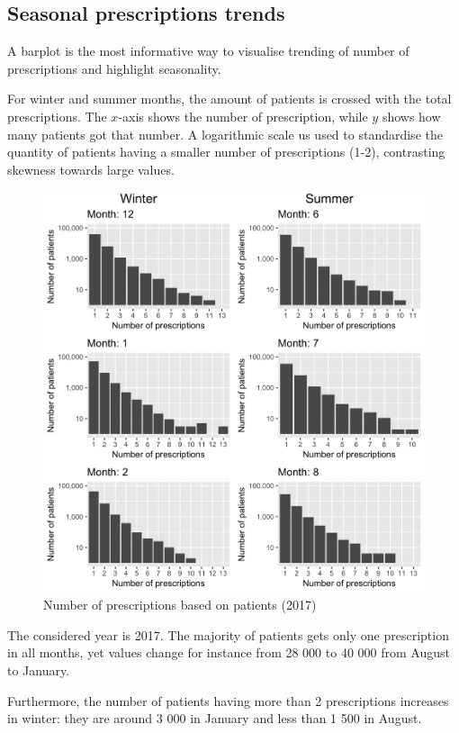 \subsection{Seasonal prescriptions trends}
A barplot is the most informative way to visualise trending of number of prescriptions and highlight seasonality. 

For winter and summer months, the amount of patients is crossed with the total prescriptions. The $x$-axis shows the number of prescription, while $y$ shows how many patients got that number. A logarithmic scale us used to standardise the quantity of patients having a smaller number of prescriptions (1-2), contrasting skewness towards large values.

\begin{figure}[h]
	\centering
	\includegraphics[scale=0.22]{../plots/prescriptions_number-month.png}
	\caption{\small Number of prescriptions based on patients (2017)}
\end{figure}

The considered year is 2017. The majority of patients gets only one prescription in all months, yet values change for instance from 28 000 to 40 000 from August to January.

Furthermore, the number of patients having more than 2 prescriptions increases in winter: they are around 3 000 in January and less than 1 500 in August.


